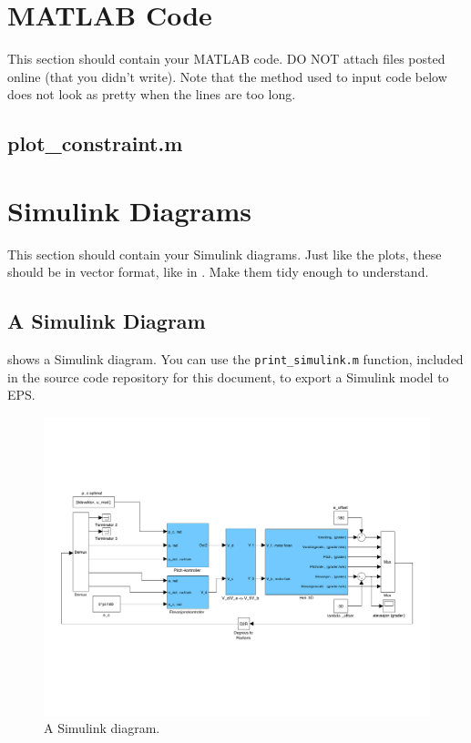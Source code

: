 \appendix

\section{MATLAB Code}\label{sec:matlab}
This section should contain your MATLAB code. DO NOT attach files posted online (that you didn't write). Note that the method used to input code below does not look as pretty when the lines are too long.

\subsection{plot\_constraint.m}\label{sec:plot_constraint_m}
\section{Simulink Diagrams}\label{sec:simulink}
This section should contain your Simulink diagrams. Just like the plots, these should be in vector format, like in . Make them tidy enough to understand.

\subsection{A Simulink Diagram}
 shows a Simulink diagram. You can use the \texttt{print\_simulink.m} function, included in the source code repository for this document, to export a Simulink model to EPS\@.
\begin{figure}[htb]
	\centering
		\includegraphics[width = \textwidth]{figures/simulink.pdf}
	\caption{A Simulink diagram.}
\label{fig:simulink}
\end{figure}

